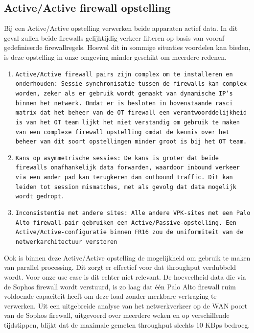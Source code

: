 \subsection{Active/Active firewall opstelling}
Bij een Active/Active opstelling verwerken beide apparaten actief data. In dit geval zullen beide firewalls gelijktijdig verkeer filteren op basis van vooraf gedefinieerde firewallregels. Hoewel dit in sommige situaties voordelen kan bieden, is deze opstelling in onze omgeving minder geschikt om meerdere redenen.


\begin{enumerate}
    \item \texttt{Active/Active firewall pairs zijn complex om te installeren en onderhouden: Sessie synchronisatie tussen de firewalls kan complex worden, zeker als er gebruik wordt gemaakt van dynamische IP’s binnen het netwerk. Omdat er is besloten in bovenstaande rasci matrix dat het beheer van de OT firewall een verantwoorddelijkheid is van het OT team lijkt het niet verstandig om gebruik te maken van een complexe firewall opstelling omdat de kennis over het beheer van dit soort opstellingen minder groot is bij het OT team.}
    
    \item \texttt{Kans op asymmetrische sessies: De kans is groter dat beide firewalls onafhankelijk data forwarden, waardoor inbound verkeer via een ander pad kan terugkeren dan outbound traffic. Dit kan leiden tot session mismatches, met als gevolg dat data mogelijk wordt gedropt.}  
    
    \item \texttt{Inconsistentie met andere sites: Alle andere VPK-sites met een Palo Alto firewall-pair gebruiken een Active/Passive-opstelling. Een Active/Active-configuratie binnen FR16 zou de uniformiteit van de netwerkarchitectuur verstoren}    
\end{enumerate}


Ook is binnen deze Active/Active opstelling de mogelijkheid om gebruik te maken van parallel processing. Dit zorgt er effectief voor dat throughput verdubbeld wordt. \autocite{Fulp2006} Voor onze use case is dit echter niet relevant. De hoeveelheid data die via de Sophos firewall wordt verstuurd, is zo laag dat één Palo Alto firewall ruim voldoende capaciteit heeft om deze load zonder merkbare vertraging te verwerken. Uit een uitgebreide analyse van het netwerkverkeer op de WAN poort van de Sophos firewall, uitgevoerd over meerdere weken en op verschillende tijdstippen, blijkt dat de maximale gemeten throughput slechts 10 KBps bedroeg.


